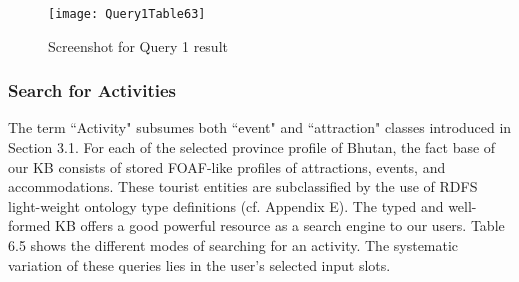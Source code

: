 \begin{figure}
\begin{center}
\texttt{[image: Query1Table63]}
\caption {Screenshot for Query 1 result}
\label{fig:Fig6.2}
\end{center}
\end{figure}

\subsubsection{Search for Activities}
\hspace{0.3in} The term ``Activity" subsumes both ``event" and ``attraction" classes introduced in Section 3.1. For each of the selected province profile of Bhutan, the fact base of our KB consists of stored FOAF-like profiles of attractions, events, and accommodations. These tourist entities are subclassified by the use of RDFS light-weight ontology type definitions (cf. Appendix E). The typed and well-formed KB offers a good powerful resource as a search engine to our users. Table 6.5 shows the different modes of searching for an activity. The systematic variation of these queries lies in the user's selected input slots.   

